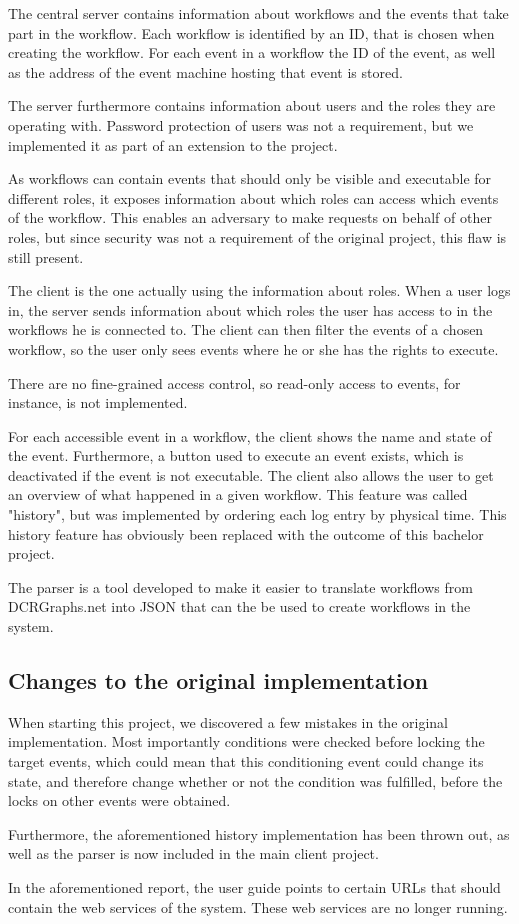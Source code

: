 		\newpar The central server contains information about workflows and the events that take part in the workflow. Each workflow is identified by an ID, that is chosen when creating the workflow. For each event in a workflow the ID of the event, as well as the address of the event machine hosting that event is stored.
		
		\newpar The server furthermore contains information about users and the roles they are operating with. Password protection of users was not a requirement, but we implemented it as part of an extension to the project.
		
		\newpar As workflows can contain events that should only be visible and executable for different roles, it exposes information about which roles can access which events of the workflow. This enables an adversary to make requests on behalf of other roles, but since security was not a requirement of the original project, this flaw is still present.
		
		\newpar The client is the one actually using the information about roles. When a user logs in, the server sends information about which roles the user has access to in the workflows he is connected to. The client can then filter the events of a chosen workflow, so the user only sees events where he or she has the rights to execute.
		
		There are no fine-grained access control, so read-only access to events, for instance, is not implemented.
		
		\newpar For each accessible event in a workflow, the client shows the name and state of the event. Furthermore, a button used to execute an event exists, which is deactivated if the event is not executable. The client also allows the user to get an overview of what happened in a given workflow. This feature was called "history", but was implemented by ordering each log entry by physical time. This history feature has obviously been replaced with the outcome of this bachelor project.
		
		\newpar The parser is a tool developed to make it easier to translate workflows from DCRGraphs.net into JSON that can the be used to create workflows in the system.
		
		\subsection{Changes to the original implementation}
			When starting this project, we discovered a few mistakes in the original implementation. Most importantly conditions were checked before locking the target events, which could mean that this conditioning event could change its state, and therefore change whether or not the condition was fulfilled, before the locks on other events were obtained. 
            
            Furthermore, the aforementioned history implementation has been thrown out, as well as the parser is now included in the main client project.

			\newpar In the aforementioned report, the user guide points to certain URLs that should contain the web services of the system. These web services are no longer running.